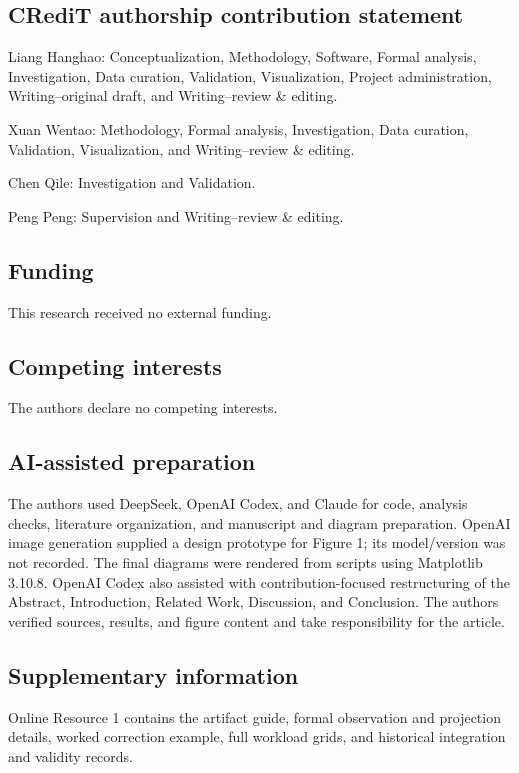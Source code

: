 \subsection*{CRediT authorship contribution statement}

Liang Hanghao: Conceptualization, Methodology, Software, Formal analysis, Investigation, Data curation, Validation, Visualization, Project administration, Writing--original draft, and Writing--review \& editing.

Xuan Wentao: Methodology, Formal analysis, Investigation, Data curation, Validation, Visualization, and Writing--review \& editing.

Chen Qile: Investigation and Validation.

Peng Peng: Supervision and Writing--review \& editing.

\subsection*{Funding}

This research received no external funding.

\subsection*{Competing interests}

The authors declare no competing interests.

\subsection*{AI-assisted preparation}

The authors used DeepSeek, OpenAI Codex, and Claude for code, analysis checks, literature organization, and manuscript and diagram preparation. OpenAI image generation supplied a design prototype for Figure 1; its model/version was not recorded. The final diagrams were rendered from scripts using Matplotlib 3.10.8. OpenAI Codex also assisted with contribution-focused restructuring of the Abstract, Introduction, Related Work, Discussion, and Conclusion. The authors verified sources, results, and figure content and take responsibility for the article.

\subsection*{Supplementary information}

Online Resource 1 contains the artifact guide, formal observation and projection details, worked correction example, full workload grids, and historical integration and validity records.
